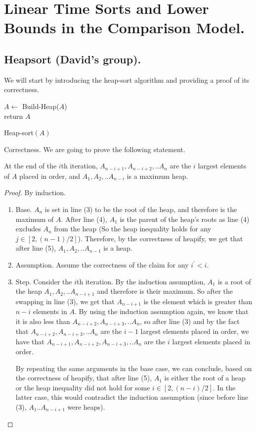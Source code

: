 \ifdefined\BOOK
\else
\setcounter{chapter}{5}
\fi

\section{Linear Time Sorts and Lower Bounds in the Comparison Model.} 
\subsection{Heapsort (David's group).}
We will start by introducing the heap-sort algorithm and providing a proof of its correctness.

\begin{algorithm}
    $A \leftarrow$ Build-Heap($A$)\\
	  return $A$
\caption{Heap-sort$(A)$}
  \end{algorithm}
Correctness. We are going to prove the following statement.
  \begin{claim}   
At the end of the $i$th iteration, $A_{n-i+1},A_{n-i+2},..A_{n}$ are the $i$ largest elements of $A$ placed in order, and $A_{1},A_{2},..A_{n-i}$ is a maximum heap.
  \end{claim}
\begin{proof}
By induction.
\begin{enumerate}
  \item Base. $A_{n}$ is set in line (3) to be the root of the heap, and therefore is the maximum of $A$. After line (4), $A_{1}$ is the parent of the heap's roots as line (4) excludes $A_{n}$ from the heap (So the heap inequality holds for any $j\in [2,(n-1)/2]$). Therefore, by the correctness of heapify, we get that after line (5), $A_{1},A_{2},..A_{n-1}$ is a heap.
  \item Assumption. Assume the correctness of the claim for any $i^{\prime}<i$.
  \item Step. Consider the $i$th iteration. By the induction assumption, $A_{1}$ is a root of the heap $A_{1},A_{2},..A_{n-i+1}$ and therefore is their maximum. So after the swapping in line (3), we get that $A_{n-i+1}$ is the element which is greater than $n-i$ elements in $A$. By using the induction assumption again, we know that it is also less than $A_{n-i+2},A_{n-i+3},..A_{n}$, so after line (3) and by the fact that $A_{n-i+2},A_{n-i+3},..A_{n}$ are the $i-1$ largest elements placed in order, we have that $A_{n-i+1},A_{n-i+2},A_{n-i+3},..A_{n}$ are the $i$ largest elements placed in order. 

    By repeating the same arguments in the base case, we can conclude, based on the correctness of heapify, that after line (5), $A_{1}$ is either the root of a heap or the heap inequality did not hold for some $i\in [2,(n-i)/2]$. In the latter case, this would contradict the induction assumption (since before line (3), $A_{1}..A_{n-i+1}$ were heaps).
\end{enumerate}
\end{proof}

